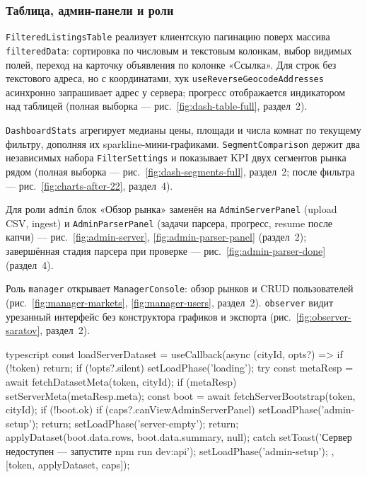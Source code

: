\subsubsection{Таблица, админ-панели и роли}

\texttt{FilteredListingsTable} реализует клиентскую пагинацию поверх массива \texttt{filteredData}: сортировка по числовым и текстовым колонкам, выбор видимых полей, переход на карточку объявления по колонке «Ссылка». Для строк без текстового адреса, но с координатами, хук \texttt{useReverseGeocodeAddresses} асинхронно запрашивает адрес у сервера; прогресс отображается индикатором над таблицей (полная выборка --- рис.~\ref{fig:dash-table-full}, раздел~2).

\texttt{DashboardStats} агрегирует медианы цены, площади и числа комнат по текущему фильтру, дополняя их sparkline-мини-графиками. \texttt{SegmentComparison} держит два независимых набора \texttt{FilterSettings} и показывает KPI двух сегментов рынка рядом (полная выборка --- рис.~\ref{fig:dash-segments-full}, раздел~2; после фильтра --- рис.~\ref{fig:charts-after-22}, раздел~4).

Для роли \texttt{admin} блок «Обзор рынка» заменён на \texttt{AdminServerPanel} (upload CSV, ingest) и \texttt{AdminParserPanel} (задачи парсера, прогресс, resume после капчи) --- рис.~\ref{fig:admin-server}, \ref{fig:admin-parser-panel} (раздел~2); завершённая стадия парсера при проверке --- рис.~\ref{fig:admin-parser-done} (раздел~4).

Роль \texttt{manager} открывает \texttt{ManagerConsole}: обзор рынков и CRUD пользователей (рис.~\ref{fig:manager-markets}, \ref{fig:manager-users}, раздел~2). \texttt{observer} видит урезанный интерфейс без конструктора графиков и экспорта (рис.~\ref{fig:observer-saratov}, раздел~2).

\begin{singleminted}{typescript}
const loadServerDataset = useCallback(async (cityId, opts?) => {
    if (!token) return;
    if (!opts?.silent) setLoadPhase('loading');
    try {
        const metaResp = await fetchDatasetMeta(token, cityId);
        if (metaResp) setServerMeta(metaResp.meta);
        const boot = await fetchServerBootstrap(token, cityId);
        if (!boot.ok) {
            if (caps?.canViewAdminServerPanel) {
                setLoadPhase('admin-setup');
                return;
            }
            setLoadPhase('server-empty');
            return;
        }
        applyDataset(boot.data.rows, boot.data.summary, null);
    } catch {
        setToast('Сервер недоступен — запустите npm run dev:api');
        setLoadPhase('admin-setup');
    }
}, [token, applyDataset, caps]);
\end{singleminted}
\label{lst:load-server}

